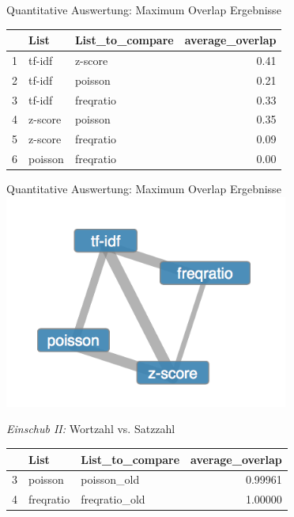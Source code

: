 \documentclass{beamer}
\begin{document}
\begin{frame}{Quantitative Auswertung: Maximum Overlap Ergebnisse}
\begin{table}[ht]
\centering
\begin{tabular}{rllr}
  \hline
 & List & List\_to\_compare & average\_overlap \\ 
  \hline
1 & tf-idf & z-score & 0.41 \\ 
  2 & tf-idf & poisson & 0.21 \\ 
  3 & tf-idf & freqratio & 0.33 \\ 
  4 & z-score & poisson & 0.35 \\ 
  5 & z-score & freqratio & 0.09 \\ 
  6 & poisson & freqratio & 0.00 \\ 
   \hline
\end{tabular}
\label{AvarageOverlapComparison}
\end{table}
\end{frame}

\begin{frame}{Quantitative Auswertung: Maximum Overlap Ergebnisse}
	  \centering
	  \includegraphics[width=0.7\textwidth]{pictures/measureCompare.png}
	  
\end{frame}

\begin{frame}{\emph{Einschub II: }Wortzahl vs. Satzzahl}
	\begin{table}[ht]
	\centering
	\begin{tabular}{rllr}
	  \hline
	 & List & List\_to\_compare & average\_overlap \\ 
	  \hline
	3 & poisson & poisson\_old &    0.99961 \\ 
	  4 & freqratio & freqratio\_old & 1.00000 \\ 
	   \hline
\end{tabular}

\label{AvarageOverlapComparison}
\end{table}
\end{frame}
\end{document}
